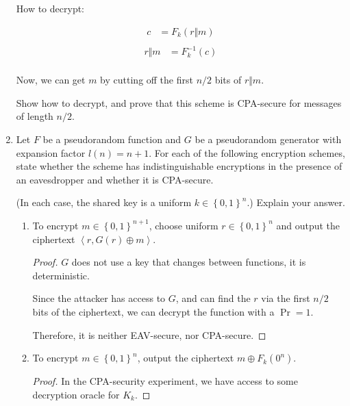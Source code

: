 \documentclass{article}
\begin{document}
\begin{enumerate}
    How to decrypt:

    \begin{align*}
      c &= F_k(r \Vert m)\\
    \end{align*}
    \begin{align*}
      r \Vert m &= F^{-1}_k(c)\\
    \end{align*}

    Now, we can get $m$ by cutting off the first $n / 2$ bits of $r \Vert m$.

    Show how to decrypt, and prove that this scheme is CPA-secure for
    messages of length $n / 2$.
  \item Let $F$ be a pseudorandom function and $G$ be a pseudorandom generator
    with expansion factor $l(n) = n + 1$. For each of the following encryption
    schemes, state whether the scheme has indistinguishable encryptions in the
    presence of an eavesdropper and whether it is CPA-secure.

    (In each case, the shared key is a uniform $k \in \left\{0, 1\right\}^n$.)
    Explain your answer.


    \begin{enumerate}
      \item To encrypt $m \in \left\{0, 1\right\}^{n + 1}$, choose uniform $r
        \in \left\{0, 1\right\}^n$ and output the ciphertext $\left\langle r,
          G(r) \oplus m\right\rangle$.

          \begin{proof}
            $G$ does not use a key that changes between functions, it is
            deterministic.

            Since the attacker has access to $G$, and can find the $r$ via the
            first $n / 2$ bits of the ciphertext, we can decrypt the function
            with a $\Pr = 1$.

            Therefore, it is neither EAV-secure, nor CPA-secure.
          \end{proof}

        \item To encrypt $m \in \left\{0, 1\right\}^n$, output the ciphertext $m
          \oplus F_k(0^n)$.

          \begin{proof}
            In the CPA-security experiment, we have access to some decryption
            oracle for $K_k$.


\end{proof}
\end{enumerate}
\end{enumerate}
\end{document}
